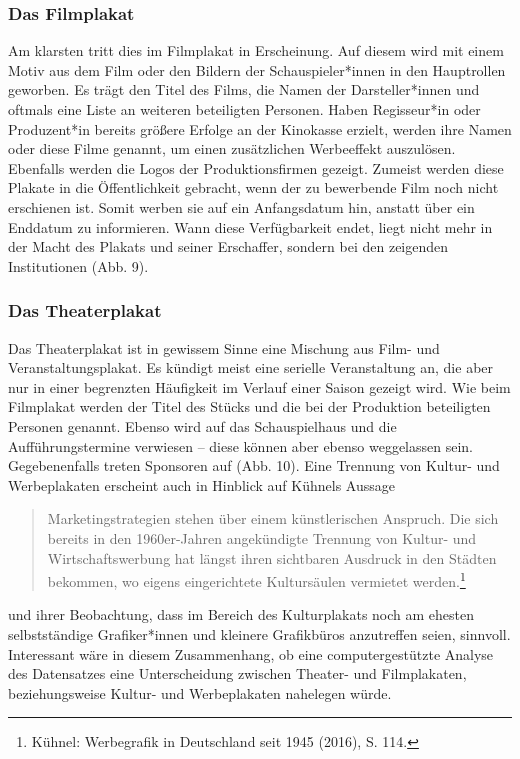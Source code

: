 \documentclass[a4paper,12pt,ngerman]{article}
\begin{document}
\subsubsection{Das Filmplakat}
Am klarsten tritt dies im Filmplakat in Erscheinung. Auf diesem wird mit einem Motiv aus dem Film oder den Bildern der Schauspieler*innen in den Hauptrollen geworben. Es trägt den Titel des Films, die Namen der Darsteller*innen und oftmals eine Liste an weiteren beteiligten Personen. Haben Regisseur*in oder Produzent*in bereits größere Erfolge an der Kinokasse erzielt, werden ihre Namen oder diese Filme genannt, um einen zusätzlichen Werbeeffekt auszulösen. Ebenfalls werden die Logos der Produktionsfirmen gezeigt. Zumeist werden diese Plakate in die Öffentlichkeit gebracht, wenn der zu bewerbende Film noch nicht erschienen ist. Somit werben sie auf ein Anfangsdatum hin, anstatt über ein Enddatum zu informieren. Wann diese Verfügbarkeit endet, liegt nicht mehr in der Macht des Plakats und seiner Erschaffer, sondern bei den zeigenden Institutionen (Abb. 9). \\

\subsubsection{Das Theaterplakat}
Das Theaterplakat ist in gewissem Sinne eine Mischung aus Film- und Veranstaltungsplakat. Es kündigt meist eine serielle Veranstaltung an, die aber nur in einer begrenzten Häufigkeit im Verlauf einer Saison gezeigt wird. Wie beim Filmplakat werden der Titel des Stücks und die bei der Produktion beteiligten Personen genannt. Ebenso wird auf das Schauspielhaus und die Aufführungstermine verwiesen -- diese können aber ebenso weggelassen sein. Gegebenenfalls treten Sponsoren auf (Abb. 10). Eine Trennung von Kultur- und Werbeplakaten erscheint auch in Hinblick auf Kühnels Aussage

\blockquote{\fontsize{10pt}{12pt} \selectfont Marketingstrategien stehen über einem künstlerischen Anspruch. Die sich bereits in den 1960er-Jahren angekündigte Trennung von Kultur- und Wirtschaftswerbung hat längst ihren sichtbaren Ausdruck in den Städten bekommen, wo eigens eingerichtete Kultursäulen vermietet werden.\footnote{Kühnel: Werbegrafik in Deutschland seit 1945 (2016), S. 114.}\\}

und ihrer Beobachtung, dass im Bereich des Kulturplakats noch am ehesten selbstständige Grafiker*innen und kleinere Grafikbüros anzutreffen seien, sinnvoll. Interessant wäre in diesem Zusammenhang, ob eine computergestützte Analyse des Datensatzes eine Unterscheidung zwischen Theater- und Filmplakaten, beziehungsweise Kultur- und Werbeplakaten nahelegen würde. \\
\end{document}
